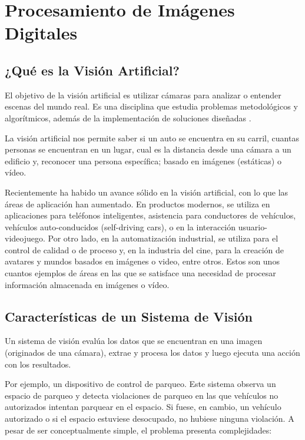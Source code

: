 \chapter{Procesamiento de Imágenes Digitales}

\section{¿Qué es la Visión Artificial?}
El objetivo de la visión artificial es utilizar cámaras para analizar o entender escenas del mundo real. Es una disciplina que estudia problemas metodológicos y algorítmicos, además de la implementación de soluciones diseñadas \cite{Klette2014-oo}.

La visión artificial nos permite saber si un auto se encuentra en su carril, cuantas personas se encuentran en un lugar, cual es la distancia desde una cámara a un edificio y, reconocer una persona específica; basado en imágenes (estáticas) o vídeo.

Recientemente ha habido un avance sólido en la visión artificial, con lo que las áreas de aplicación han aumentado. En productos modernos, se utiliza en aplicaciones para teléfonos inteligentes, asistencia para conductores de vehículos, vehículos auto-conducidos (self-driving cars), o en la interacción usuario-videojuego.  Por otro lado, en la automatización industrial, se utiliza para el control de calidad o de proceso y, en la industria del cine, para la creación de avatares y mundos basados en imágenes o video, entre otros.  Estos son unos cuantos ejemplos de áreas en las que se satisface una necesidad de procesar información almacenada en imágenes o vídeo. 


\section{Características de un Sistema de Visión}
Un sistema de visión evalúa los datos que se encuentran en una imagen (originados de una cámara), extrae y procesa los datos y luego ejecuta una acción con los resultados.

Por ejemplo, un dispositivo de control de parqueo. Este sistema observa un espacio de parqueo y detecta violaciones de parqueo en las que vehículos no autorizados intentan parquear en el espacio. Si fuese, en cambio, un vehículo autorizado o si el espacio estuviese desocupado, no hubiese ninguna violación. A pesar de ser conceptualmente simple, el problema presenta complejidades:

